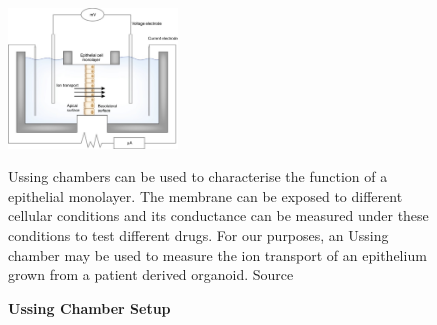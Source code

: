 \begin{figure}
	\label{ussing_chamber}
	\begin{center}
	\includegraphics[width=0.4\textwidth]{figures/ussing_chamber.jpg}
	\end{center}
	\captionsetup{singlelinecheck = false, justification=raggedright}
	\caption[Ussing Chamber Setup] {\textbf{Ussing Chamber Setup}}{Ussing chambers can be used to characterise the function of a epithelial monolayer. The membrane can be exposed to different cellular conditions and its conductance can be measured under these conditions to test different drugs. For our purposes, an Ussing chamber may be used to measure the ion transport of an epithelium grown from a patient derived organoid. Source \cite{hoenig2014}} 
\end{figure}


